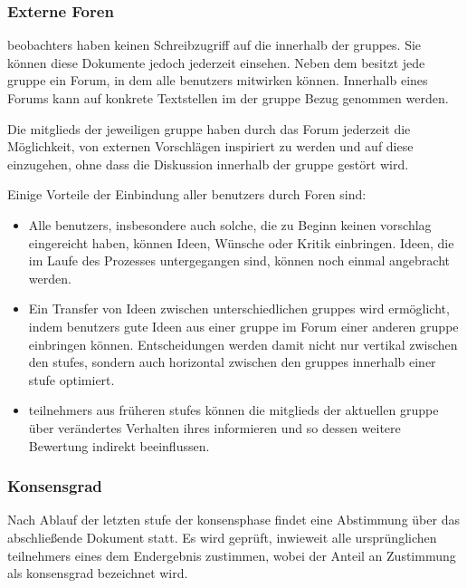 \documentclass[10pt]{article}
\begin{document}
\subsubsection{Externe Foren}

\glspl{beobachter} haben keinen Schreibzugriff auf die  innerhalb der \glspl{gruppe}. Sie können diese Dokumente jedoch jederzeit einsehen. Neben dem  besitzt jede \gls{gruppe} ein Forum, in dem alle \glspl{benutzer} mitwirken können. Innerhalb eines Forums kann auf konkrete Textstellen im  der \gls{gruppe} Bezug genommen werden.

Die \glspl{mitglied} der jeweiligen \gls{gruppe} haben durch das Forum jederzeit die Möglichkeit, von externen Vorschlägen inspiriert zu werden und auf diese einzugehen, ohne dass die Diskussion innerhalb der \gls{gruppe} gestört wird. 

Einige Vorteile der Einbindung aller \glspl{benutzer} durch Foren sind:

\begin{itemize}
    \item Alle \glspl{benutzer}, insbesondere auch solche, die zu Beginn keinen \gls{vorschlag} eingereicht haben, können Ideen, Wünsche oder Kritik einbringen. Ideen, die im Laufe des Prozesses untergegangen sind, können noch einmal angebracht werden.
    \item Ein Transfer von Ideen zwischen unterschiedlichen \glspl{gruppe} wird ermöglicht, indem \glspl{benutzer} gute Ideen aus einer \gls{gruppe} im Forum einer anderen \gls{gruppe} einbringen können. Entscheidungen werden damit nicht nur vertikal zwischen den \glspl{stufe}, sondern auch horizontal zwischen den \glspl{gruppe} innerhalb einer \gls{stufe} optimiert.
    \item \glspl{teilnehmer} aus früheren \glspl{stufe} können die \glspl{mitglied} der aktuellen \gls{gruppe} über verändertes Verhalten ihres  informieren und so dessen weitere Bewertung indirekt beeinflussen.
\end{itemize}

\subsubsection{Konsensgrad}

Nach Ablauf der letzten \gls{stufe} der \gls{konsensphase} findet eine Abstimmung über das abschließende Dokument statt. Es wird geprüft, inwieweit alle ursprünglichen \glspl{teilnehmer} eines  dem Endergebnis zustimmen, wobei der Anteil an Zustimmung als \gls{konsensgrad} bezeichnet wird.
\end{document}
